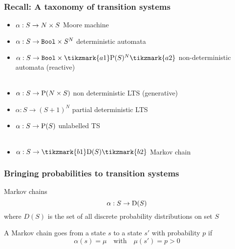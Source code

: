 \documentclass[aspectratio=169]{beamer}
\begin{document}
\begin{frame}[t]\frametitle{Recall: A taxonomy of transition systems}
  \begin{itemize}
    \item $\alpha: S \to N \times S$ \alert{Moore machine}
    \item $\alpha: S \to \mathtt{Bool} \times S^{N}$ \alert{deterministic automata}
    \item $\alpha: S \to \mathtt{Bool} \times \tikzmark{a1} \Pow(S)^{\Act} \tikzmark{a2}$ \alert{non-deterministic automata (reactive)}
    \\~
    \item $\alpha : S \to \mathrm{P}( N \times S )$ \alert{non deterministic LTS (generative)}
    \item $\alpha : S \to (S + 1)^N$ \alert{partial deterministic LTS} %
    \item $\alpha : S \to \mathrm{P}(S)$ \alert{unlabelled TS}
    \\~
    \item $\alpha: S \to \tikzmark{b1} \Dist(S) \tikzmark{b2}$ \alert{Markov chain}

  \end{itemize}  


\end{frame}

\begin{frame}[t]\frametitle{Bringing probabilities to transition systems}
  
  \begin{alertblock}{Markov chains}
    $$\alpha : S \to \mathrm{D}(S)$$
    where $D(S)$ is the set of all \alert{discrete probability distributions} on set $S$

    A Markov chain goes from a state $s$ to a state $s'$ with probability $p$ if
    $$\alpha(s) = \mu\text{~~~with~~~} \mu(s') = p > 0$$
  \end{alertblock}


\end{frame}
\end{document}
